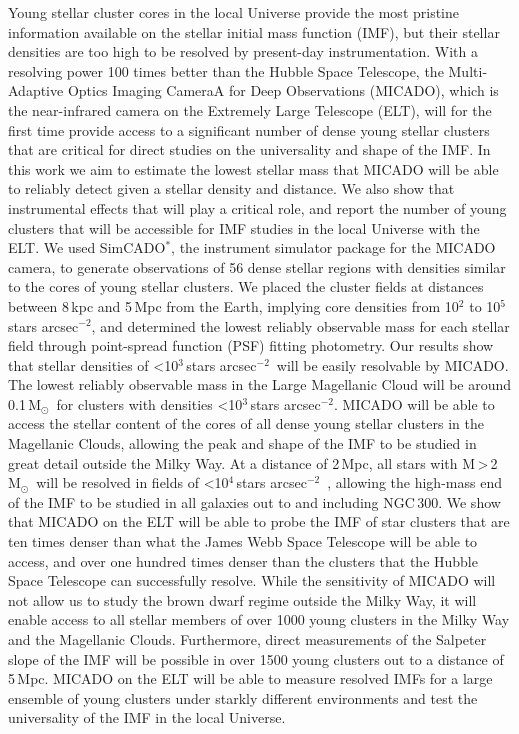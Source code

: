 \documentclass[referee]{aa}
\newcommand{\msun}{M$_\odot$~}
\newcommand{\h}[1]{$^{#1}$}
\newcommand{\spa}{stars arcsec$^{-2}$~}
\newcommand{\spae}{stars arcsec$^{-2}$}
\begin{document}
  \abstract
{Young stellar cluster cores in the local Universe provide the most pristine information available on the stellar initial mass function (IMF), but their stellar densities are too high to be resolved by present-day instrumentation.
With a resolving power 100 times better than the Hubble Space Telescope, the Multi-Adaptive Optics Imaging CameraA for Deep Observations (MICADO), which is the near-infrared camera on the Extremely Large Telescope (ELT), will for the first time provide access to a significant number of dense young stellar clusters that are critical for direct studies on the universality and shape of the IMF.}
{In this work we aim to estimate the lowest stellar mass that MICADO will be able to reliably detect given a stellar density and distance.
We also show that instrumental effects that will play a critical role, and report the number of young clusters that will be accessible for IMF studies in the local Universe with the ELT.}
{We used SimCADO$^*$, the instrument simulator package for the MICADO camera, to generate observations of 56 dense stellar regions with densities similar to the cores of young stellar clusters.
We placed the cluster fields at distances between 8\,kpc and 5\,Mpc from the Earth, implying core densities from 10\h2 to 10\h5\,\spae, and determined the lowest reliably observable mass for each stellar field through point-spread function (PSF) fitting photometry.}
{Our results show that stellar densities of \textless10\h3\,\spa will be easily resolvable by MICADO. The lowest reliably observable mass in the Large Magellanic Cloud will be around 0.1\,\msun for clusters with densities \textless10\h3\,\spae.
MICADO will be able to access the stellar content of the cores of all dense young stellar clusters in the Magellanic Clouds, allowing the peak and shape of the IMF to be studied in great detail outside the Milky Way.
At a distance of 2\,Mpc, all stars with M\,\textgreater\,2\,\msun will be resolved in fields of \textless10\h4\,\spa, allowing the high-mass end of the IMF to be studied in all galaxies out to and including NGC\,300.}
{We show that MICADO on the ELT will be able to probe the IMF of star clusters that are ten times denser than what the James Webb Space Telescope will be able to access,
and over one hundred times denser than the clusters that the Hubble Space Telescope can successfully resolve.
While the sensitivity of MICADO will not allow us to study the brown dwarf regime outside the Milky Way, it will enable access to all stellar members of over 1000 young clusters in the Milky Way and the Magellanic Clouds.
Furthermore, direct measurements of the Salpeter slope of the IMF will be possible in over 1500 young clusters out to a distance of 5\,Mpc.
MICADO on the ELT will be able to measure resolved IMFs for a large ensemble of young clusters under starkly different environments and test the universality of the IMF in the local Universe.}
\end{document}

